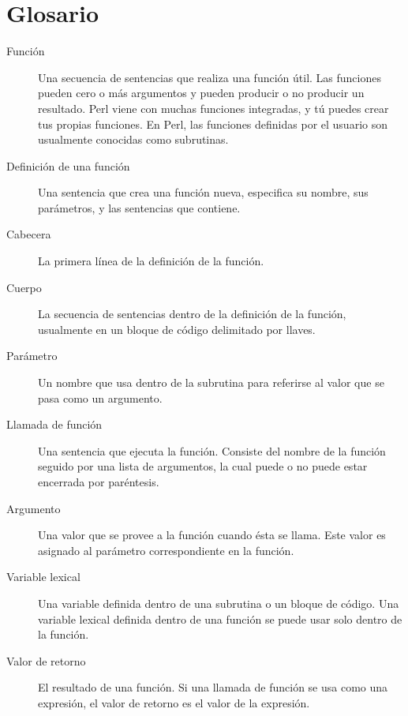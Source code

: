 \section{Glosario}

\begin{description}

\item[Función] Una secuencia de sentencias que realiza 
una función útil. Las funciones pueden cero o más argumentos
y pueden producir o no producir un resultado. Perl viene con 
muchas funciones integradas, y tú puedes crear tus propias
funciones. En Perl, las funciones definidas por el usuario son
usualmente conocidas como subrutinas.

\item[Definición de una función]  Una sentencia que crea una función
nueva, especifica su nombre, sus parámetros, y las sentencias
que contiene.

\item[Cabecera] La primera línea de la definición de la 
función.

\item[Cuerpo] La secuencia de sentencias dentro de la definición
de la función, usualmente en un bloque de código delimitado por
llaves.

\item[Parámetro] Un nombre que usa dentro de la subrutina
para referirse al valor que se pasa como un argumento.

\item[Llamada de función] Una sentencia que ejecuta la función.
Consiste del nombre de la función seguido por una lista de 
argumentos, la cual puede o no puede estar encerrada por
paréntesis.

\item[Argumento] Una valor que se provee a la función cuando
ésta se llama. Este valor es asignado al parámetro 
correspondiente en la función.

\item[Variable lexical] Una variable definida dentro de una
subrutina o un bloque de código. Una variable lexical definida
dentro de una función se puede usar solo dentro de la función.

\item[Valor de retorno]  El resultado de una función. Si una llamada
de función se usa como una expresión, el valor de retorno es el valor 
de la expresión.


\end{description}

